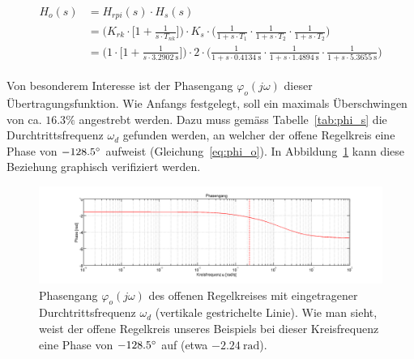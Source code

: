 \begin{gather} \label{eq:pi:h_open}
    \begin{split}
        H_o (s) & = H_{rpi} (s) \cdot H_s (s) \\
            & = \Biggl(
                    K_{rk} \cdot \biggl[ 1 + \frac{1}{s \cdot T_{nk}} \biggr]
                \Biggr)
                \cdot
                K_s
                \cdot
                \Biggl(
                        \frac{1}{1 + s \cdot T_1}
                  \cdot \frac{1}{1 + s \cdot T_2}
                  \cdot \frac{1}{1 + s \cdot T_2}
                \Biggr) \\
            & = \Biggl(
                    1 \cdot \biggl[ 1 + \frac{1}{s \cdot \SI{3.2902}{\second}} \biggr]
                \Biggr)
                \cdot
                2
                \cdot
                \Biggl(
                          \frac{1}{1 + s \cdot \SI{0.4134}{\second}}
                    \cdot \frac{1}{1 + s \cdot \SI{1.4894}{\second}}
                    \cdot \frac{1}{1 + s \cdot \SI{5.3655}{\second}}
                \Biggr)
    \end{split}
\end{gather}


Von   besonderem    Interesse   ist   der    Phasengang   $\varphi_o(j\omega)$
dieser  \"Ubertragungsfunktion. Wie  Anfangs  festgelegt,  soll  ein  maximals
\"Uberschwingen  von   ca. $16.3\%$  angestrebt  werden. Dazu   muss  gem\"ass
Tabelle~\ref{tab:phi_s}  die Durchtrittsfrequenz  $\omega_d$ gefunden  werden,
an  welcher der  offene  Regelkreis eine  Phase  von $-128.5\degree$  aufweist
(Gleichung~\ref{eq:phi_o}). In   Abbildung~\ref{fig:pi:omega_d}   kann   diese
Beziehung graphisch verifiziert werden.

\begin{figure}[h! width=\pagewidth]
    \includegraphics[width=\textwidth]{images/piOffenerRegelkreisPhasengang.png}
    \caption{%
        Phasengang   $\varphi_o(j\omega)$   des   offenen   Regelkreises   mit
        eingetragener Durchtrittsfrequenz $\omega_{d}$ (vertikale gestrichelte
        Linie). Wie man  sieht, weist der offene  Regelkreis unseres Beispiels
        bei dieser Kreisfrequenz eine Phase von $-128.5\degree$ auf
        (etwa $\SI{-2.24}{\radian}$).
    }
    \label{fig:pi:omega_d}
\end{figure}


